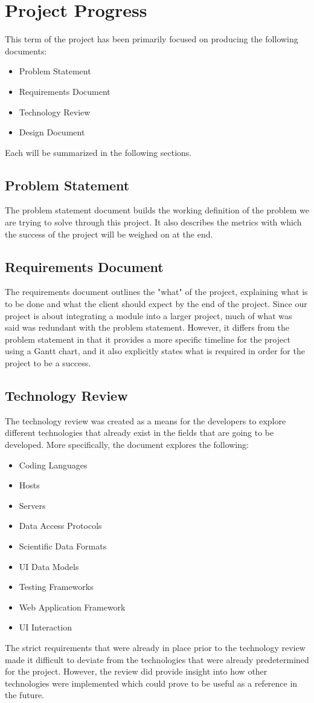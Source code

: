 \documentclass[onecolumn, draftclsnofoot,10pt, compsoc]{IEEEtran}
\begin{document}
\section{Project Progress}
This term of the project has been primarily focused on producing the following documents:
\begin{itemize}
\item Problem Statement
\item Requirements Document
\item Technology Review
\item Design Document
\end{itemize}
Each will be summarized in the following sections.

\subsection{Problem Statement}
The problem statement document builds the working definition of the problem we are trying to solve through this project. It also describes the metrics with which the success of the project will be weighed on at the end.

\subsection{Requirements Document}
The requirements document outlines the "what" of the project, explaining what is to be done and what the client should expect by the end of the project. Since our project is about integrating a module into a larger project, much of what was said was redundant with the problem statement. However, it differs from the problem statement in that it provides a more specific timeline for the project using a Gantt chart, and it also explicitly states what is required in order for the project to be a success.

\subsection{Technology Review}
The technology review was created as a means for the developers to explore different technologies that already exist in the fields that are going to be developed. More specifically, the document explores the following: 
\begin{itemize}
\item Coding Languages
\item Hosts
\item Servers
\item Data Access Protocols
\item Scientific Data Formats
\item UI Data Models
\item Testing Frameworks
\item Web Application Framework
\item UI Interaction
\end{itemize}
The strict requirements that were already in place prior to the technology review made it difficult to deviate from the technologies that were already predetermined for the project. However, the review did provide insight into how other technologies were implemented which could prove to be useful as a reference in the future.
\end{document}
